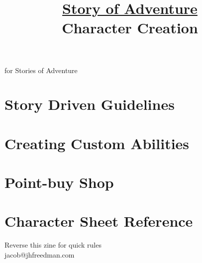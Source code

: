 \documentclass[statementpaper,oneside,article,14pt]{memoir}
\newcommand{\BackgroundPic}[1]{%
	\put(0,0){%
		\parbox[b][\paperheight]{\paperwidth}{%
			\vfill
			\centering
			{\transparent{0.4} \texttt{[image: \#1]}}%
			\vfill
}}}
\begin{document}
	
	
	
	
	\title{\underline{Story of Adventure}\\Character Creation}
	\date{}
	\begingroup
	\let\cleardoublepage\clearpage
	
	
	\begin{titlingpage}
		\maketitle
		
		for Stories of Adventure
		
	\end{titlingpage}
	
	\endgroup
	
	\pagestyle{empty}
	
	
	
	\section*{Story Driven Guidelines}
	
	\section*{Creating Custom Abilities}
	
	\section*{Point-buy Shop}
	
	\section*{Character Sheet Reference}
	
	
	
	\newpage
	
	Reverse this zine for quick rules
	\\jacob@jhfreedman.com
	
\end{document}
